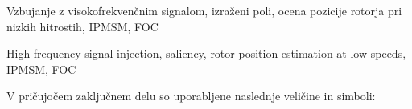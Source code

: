 \documentclass[a4paper,twoside,openright,12pt,slovene]{book}
\begin{document}
\kljucnebesede
Vzbujanje z visokofrekvenčnim signalom, izraženi poli, ocena pozicije rotorja pri nizkih hitrostih, IPMSM, FOC



\abstract


\keywords
High frequency signal injection, saliency, rotor position estimation at low speeds, IPMSM, FOC


\tableofcontents

\seznamslik

\seznamsimbolov
V pričujočem zaključnem delu so uporabljene naslednje veličine in simboli:
\end{document}
